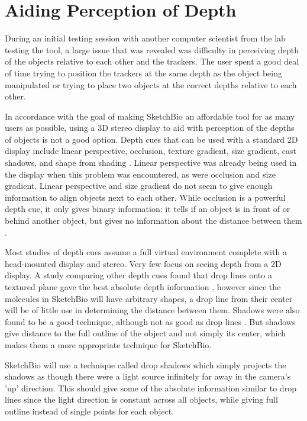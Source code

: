 \documentclass{article} %
\begin{document}


\section{Aiding Perception of Depth}

During an initial testing session with another computer scientist from the lab testing the tool, a large issue that was revealed was difficulty in perceiving depth of the objects relative to each other and the trackers.  The user spent a good deal of time trying to position the trackers at the same depth as the object being manipulated or trying to place two objects at the correct depths relative to each other.

In accordance with the goal of making SketchBio an affordable tool for as many users as possible, using a 3D stereo display to aid with perception of the depths of objects is not a good option.  Depth cues that can be used with a standard 2D display include linear perspective, occlusion, texture gradient, size gradient, cast shadows, and shape from shading \cite{Ware_book}.  Linear perspective was already being used in the display when this problem was encountered, as were occlusion and size gradient.  Linear perspective and size gradient do not seem to give enough information to align objects next to each other.  While occlusion is a powerful depth cue, it only gives binary information: it tells if an object is in front of or behind another object, but gives no information about the distance between them \cite{Ware_book}.

Most studies of depth cues assume a full virtual environment complete with a head-mounted display and stereo.  Very few focus on seeing depth from a 2D display.  A study comparing other depth cues found that drop lines onto a textured plane gave the best absolute depth information \cite{Hendrix1995103}, however since the molecules in SketchBio will have arbitrary shapes, a drop line from their center will be of little use in determining the distance between them.  Shadows were also found to be a good technique, although not as good as drop lines \cite{Hendrix1995103}.  But shadows give distance to the full outline of the object and not simply its center, which makes them a more appropriate technique for SketchBio.

SketchBio will use a technique called drop shadows which simply projects the shadows as though there were a light source infinitely far away in the camera's 'up' direction.  This should give some of the absolute information similar to drop lines since the light direction is constant across all objects, while giving full outline instead of single points for each object.



\end{document}
